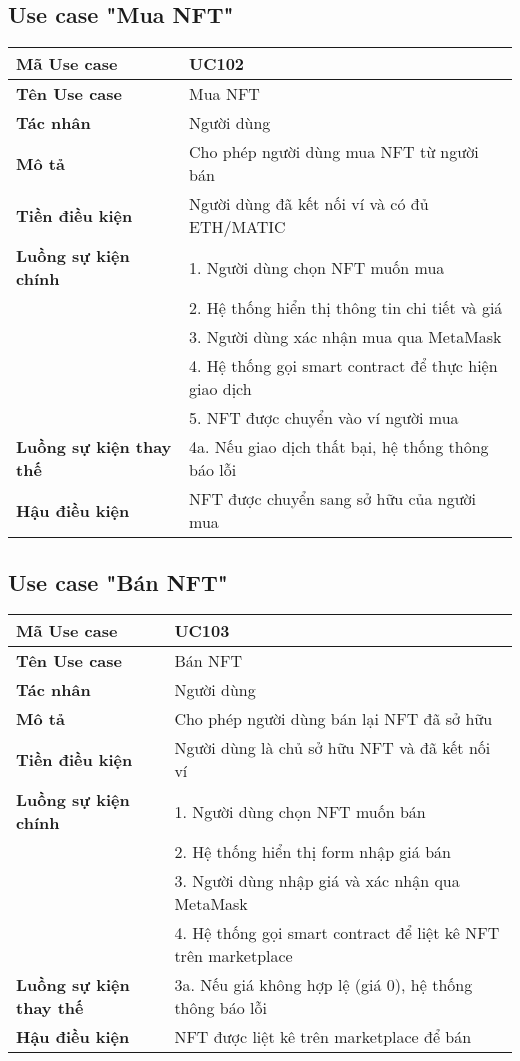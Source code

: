 \documentclass[a4paper,12pt]{report}
\begin{document}
\subsection{Use case "Mua NFT"}
\begin{tabular}{|l|p{10cm}|}
    \hline
    \textbf{Mã Use case} & UC102 \\
    \hline
    \textbf{Tên Use case} & Mua NFT \\
    \hline
    \textbf{Tác nhân} & Người dùng \\
    \hline
    \textbf{Mô tả} & Cho phép người dùng mua NFT từ người bán \\
    \hline
    \textbf{Tiền điều kiện} & Người dùng đã kết nối ví và có đủ ETH/MATIC \\
    \hline
    \textbf{Luồng sự kiện chính} & 1. Người dùng chọn NFT muốn mua \\
    & 2. Hệ thống hiển thị thông tin chi tiết và giá \\
    & 3. Người dùng xác nhận mua qua MetaMask \\
    & 4. Hệ thống gọi smart contract để thực hiện giao dịch \\
    & 5. NFT được chuyển vào ví người mua \\
    \hline
    \textbf{Luồng sự kiện thay thế} & 4a. Nếu giao dịch thất bại, hệ thống thông báo lỗi \\
    \hline
    \textbf{Hậu điều kiện} & NFT được chuyển sang sở hữu của người mua \\
    \hline
\end{tabular}

\subsection{Use case "Bán NFT"}
\begin{tabular}{|l|p{10cm}|}
    \hline
    \textbf{Mã Use case} & UC103 \\
    \hline
    \textbf{Tên Use case} & Bán NFT \\
    \hline
    \textbf{Tác nhân} & Người dùng \\
    \hline
    \textbf{Mô tả} & Cho phép người dùng bán lại NFT đã sở hữu \\
    \hline
    \textbf{Tiền điều kiện} & Người dùng là chủ sở hữu NFT và đã kết nối ví \\
    \hline
    \textbf{Luồng sự kiện chính} & 1. Người dùng chọn NFT muốn bán \\
    & 2. Hệ thống hiển thị form nhập giá bán \\
    & 3. Người dùng nhập giá và xác nhận qua MetaMask \\
    & 4. Hệ thống gọi smart contract để liệt kê NFT trên marketplace \\
    \hline
    \textbf{Luồng sự kiện thay thế} & 3a. Nếu giá không hợp lệ (giá 0), hệ thống thông báo lỗi \\
    \hline
    \textbf{Hậu điều kiện} & NFT được liệt kê trên marketplace để bán \\
    \hline
\end{tabular}
\end{document}
